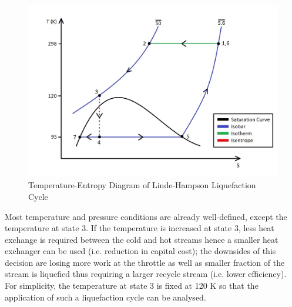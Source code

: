         \begin{figure}[H]
            \centering
            \includegraphics[scale=0.3]{liquefier_T-S_diagram.jpg}
            \caption{Temperature-Entropy Diagram of Linde-Hampson Liquefaction Cycle}
            \label{liquefier_T-S_diagram}
        \end{figure}
        \noindent Most temperature and pressure conditions are already well-defined, except the temperature at state 3. If the temperature is increased at state 3, less heat exchange is required between the cold and hot streams hence a smaller heat exchanger can be used (i.e. reduction in capital cost); the downsides of this decision are losing more work at the throttle as well as smaller fraction of the stream is liquefied thus requiring a larger recycle stream (i.e. lower efficiency). For simplicity, the temperature at state 3 is fixed at 120 K so that the application of such a liquefaction cycle can be analysed. \\
        
